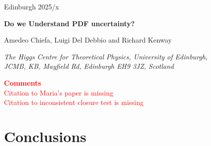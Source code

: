 \documentclass[11pt,a4paper]{article}
\newcommand{\red}[1]{\textcolor{red}{#1}}
\begin{document}
\vspace{-2.0cm}
\begin{flushright}
Edinburgh 2025/x
\end{flushright}
\vspace{0.3cm}

\begin{center}
  {\Large \bf Do we Understand PDF uncertainty?}
  \vspace{1.1cm}

  Amedeo Chiefa, Luigi Del Debbio and Richard Kenway

  \vspace{0.2cm}

  {\it \small
    The Higgs Centre for Theoretical Physics, University of Edinburgh,\\
    JCMB, KB, Mayfield Rd, Edinburgh EH9 3JZ, Scotland\\[0.1cm]
  }
  \vspace{0.7cm}

  {\Large \bf \textcolor{red}{Comments}}\\
  \red{
    Citation to Maria's paper is missing\\
    Citation to inconsistent closure test is missing\\
  }
\end{center}

\begin{abstract}
  Parton Distribution Functions (PDFs) play a crucial role in describing
  experimental data at hadron colliders and provide insight into proton
  structure. As the LHC enters an era of high-precision measurements, a robust
  PDF determination with a reliable uncertainty quantification has become
  increasingly important to match the experimental precision. The NNPDF
  collaboration has pioneered the use of Machine Learning (ML) techniques for PDF
  determination. In this work, we develop a theoretical framework based on the
  Neural Tangent Kernel (NTK) to analyze the training dynamics of Neural
  Networks. This approach allows us to derive, under certain assumptions, an
  analytical description of how the neural network evolves during training,
  enabling us to better understand the NNPDF methodology and its dependence on
  the underlying model architecture. Notably, we demonstrate that our results
  contrast, to some extent, with the standard picture of the \textit{lazy training}
  regime commonly discussed in the ML community.
\end{abstract}

\tableofcontents
\clearpage








\section{Conclusions}
\label{sec:Conclusions}

\newpage


\appendix





\end{document}
